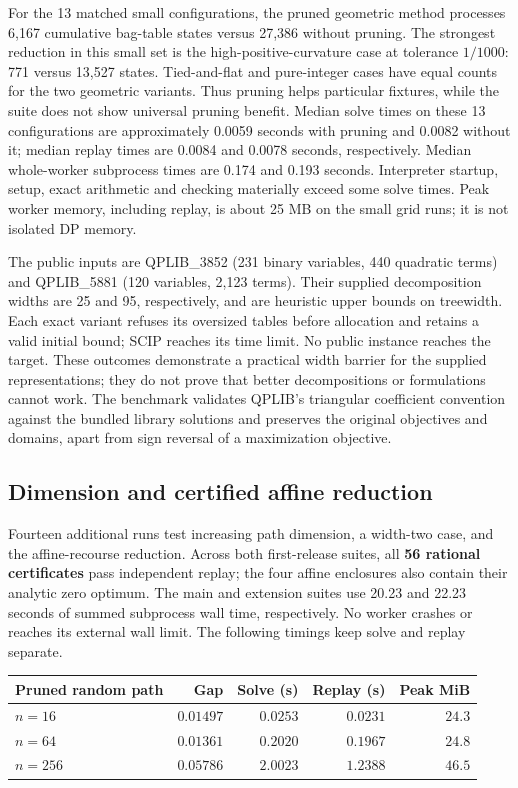 For the 13 matched small configurations, the pruned geometric method
processes 6,167 cumulative bag-table states versus 27,386 without pruning.
The strongest reduction in this small set is the high-positive-curvature
case at tolerance $1/1000$: 771 versus 13,527 states. Tied-and-flat and
pure-integer cases have equal counts for the two geometric variants.
Thus pruning helps particular fixtures, while the suite does not show
universal pruning benefit. Median solve times on these 13 configurations
are approximately 0.0059 seconds with pruning and 0.0082 without it;
median replay times are 0.0084 and 0.0078 seconds, respectively. Median
whole-worker subprocess times are 0.174 and 0.193 seconds. Interpreter
startup, setup, exact arithmetic and checking materially exceed some solve
times. Peak worker memory, including replay, is about 25 MB on the small
grid runs; it is not isolated DP memory.

The public inputs are QPLIB\_3852 (231 binary variables, 440 quadratic
terms) and QPLIB\_5881 (120 variables, 2,123 terms). Their supplied
decomposition widths are 25 and 95, respectively, and are heuristic
upper bounds on treewidth. Each exact variant refuses its oversized
tables before allocation and retains a valid initial bound; SCIP reaches
its time limit. No public instance reaches the target. These outcomes
demonstrate a practical width barrier for the supplied representations;
they do not prove that better decompositions or formulations cannot work.
The benchmark validates QPLIB's triangular coefficient convention against
the bundled library solutions and preserves the original objectives and
domains, apart from sign reversal of a maximization objective.

\subsection{Dimension and certified affine reduction}
Fourteen additional runs test increasing path dimension, a width-two
case, and the affine-recourse reduction. Across both first-release suites,
all \textbf{56 rational certificates} pass independent replay; the four
affine enclosures also contain their analytic zero optimum. The main
and extension suites use 20.23 and 22.23 seconds of summed subprocess
wall time, respectively. No worker crashes or reaches its external wall
limit. The following timings keep solve and replay separate.

\begin{center}
\begin{tabular}{lrrrr}
\toprule
Pruned random path & Gap & Solve (s) & Replay (s) & Peak MiB\\
\midrule
$n=16$ & $0.01497$ & $0.0253$ & $0.0231$ & $24.3$\\
$n=64$ & $0.01361$ & $0.2020$ & $0.1967$ & $24.8$\\
$n=256$ & $0.05786$ & $2.0023$ & $1.2388$ & $46.5$\\
\bottomrule
\end{tabular}
\end{center}


